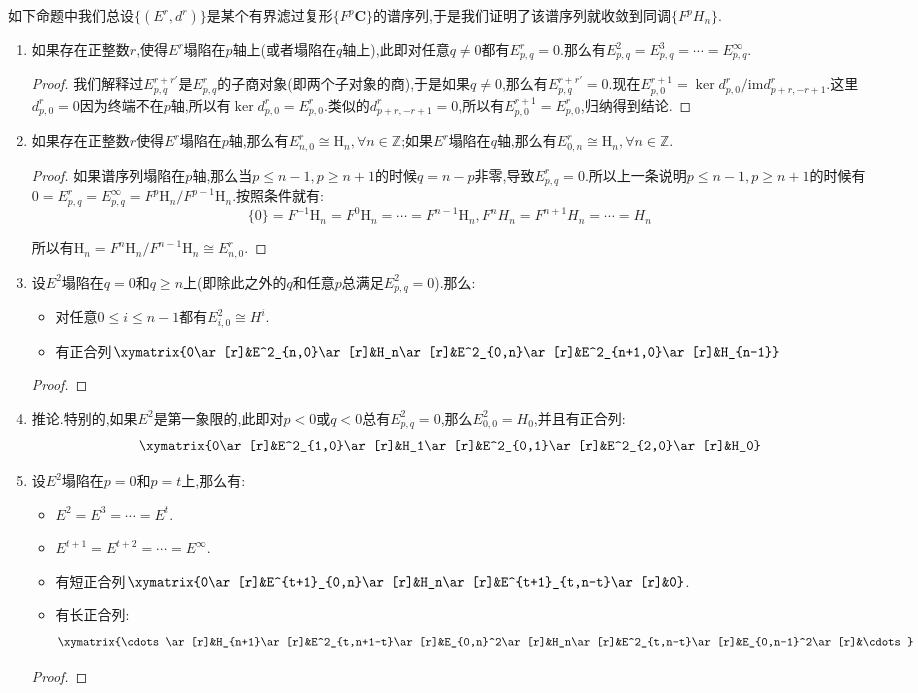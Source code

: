 如下命题中我们总设$\{(E^r,d^r)\}$是某个有界滤过复形$\{F^p\textbf{C}\}$的谱序列,于是我们证明了该谱序列就收敛到同调$\{F^pH_n\}$.
\begin{enumerate}
	\item 如果存在正整数$r$,使得$E^r$塌陷在$p$轴上(或者塌陷在$q$轴上),此即对任意$q\not=0$都有$E^r_{p,q}=0$.那么有$E_{p,q}^2=E_{p,q}^3=\cdots=E_{p,q}^{\infty}$.
	\begin{proof}
		
		我们解释过$E^{r+r'}_{p,q}$是$E_{p,q}^r$的子商对象(即两个子对象的商),于是如果$q\not=0$,那么有$E_{p,q}^{r+r'}=0$.现在$E_{p,0}^{r+1}=\ker d_{p,0}^r/\mathrm{im}d_{p+r,-r+1}^r$.这里$d_{p,0}^r=0$因为终端不在$p$轴,所以有$\ker d_{p,0}^r=E_{p,0}^r$.类似的$d_{p+r,-r+1}^r=0$,所以有$E_{p,0}^{r+1}=E_{p,0}^r$,归纳得到结论.
	\end{proof}
    \item 如果存在正整数$r$使得$E^r$塌陷在$p$轴,那么有$E_{n,0}^r\cong\mathrm{H}_n,\forall n\in\mathbb{Z}$;如果$E^r$塌陷在$q$轴,那么有$E_{0,n}^r\cong\mathrm{H}_n,\forall n\in\mathbb{Z}$.
    \begin{proof}
    	
    	如果谱序列塌陷在$p$轴,那么当$p\le n-1,p\ge n+1$的时候$q=n-p$非零,导致$E_{p,q}^r=0$.所以上一条说明$p\le n-1,p\ge n+1$的时候有$0=E_{p,q}^r=E_{p,q}^{\infty}=F^p\mathrm{H}_n/F^{p-1}\mathrm{H}_n$.按照条件就有:$$\{0\}=F^{-1}\mathrm{H}_n=F^0\mathrm{H}_n=\cdots=F^{n-1}\mathrm{H}_n,F^nH_n=F^{n+1}H_n=\cdots=H_n$$
    	
    	所以有$\mathrm{H}_n=F^n\mathrm{H}_n/F^{n-1}\mathrm{H}_n\cong E_{n,0}^r$.
    \end{proof}
    \item 设$E^2$塌陷在$q=0$和$q\ge n$上(即除此之外的$q$和任意$p$总满足$E^2_{p,q}=0$).那么:
    \begin{itemize}
    	\item 对任意$0\le i\le n-1$都有$E^2_{i,0}\cong H^i$.
    	\item 有正合列$\xymatrix{0\ar[r]&E^2_{n,0}\ar[r]&H_n\ar[r]&E^2_{0,n}\ar[r]&E^2_{n+1,0}\ar[r]&H_{n-1}}$
    \end{itemize}
    \begin{proof}
    	
    	
    \end{proof}
    \item 推论.特别的,如果$E^2$是第一象限的,此即对$p<0$或$q<0$总有$E^2_{p,q}=0$,那么$E^2_{0,0}=H_0$,并且有正合列:$$\xymatrix{0\ar[r]&E^2_{1,0}\ar[r]&H_1\ar[r]&E^2_{0,1}\ar[r]&E^2_{2,0}\ar[r]&H_0}$$
    \item 设$E^2$塌陷在$p=0$和$p=t$上,那么有:
    \begin{itemize}
    	\item $E^2=E^3=\cdots=E^t$.
    	\item $E^{t+1}=E^{t+2}=\cdots=E^{\infty}$.
    	\item 有短正合列$\xymatrix{0\ar[r]&E^{t+1}_{0,n}\ar[r]&H_n\ar[r]&E^{t+1}_{t,n-t}\ar[r]&0}$.
    	\item 有长正合列:
    	$$\xymatrix{\cdots\ar[r]&H_{n+1}\ar[r]&E^2_{t,n+1-t}\ar[r]&E_{0,n}^2\ar[r]&H_n\ar[r]&E^2_{t,n-t}\ar[r]&E_{0,n-1}^2\ar[r]&\cdots}$$
    \end{itemize}
    \begin{proof}
    	

\end{proof}
\end{enumerate}
